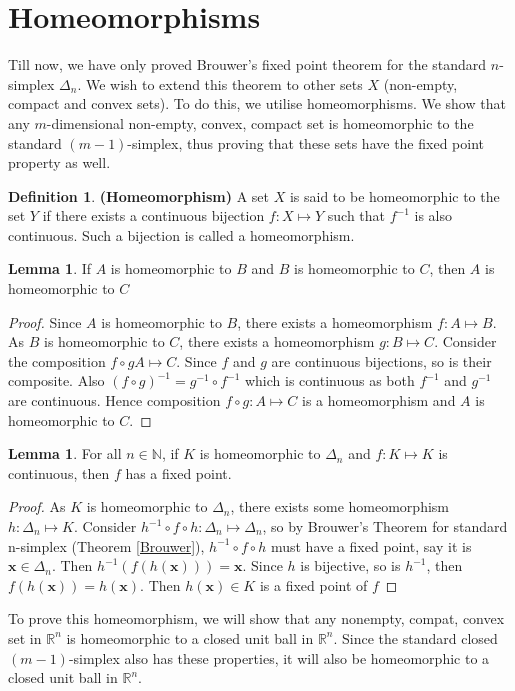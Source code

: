 \documentclass{article}
\theoremstyle{definition}
\newtheorem{lem}[theorem]{Lemma}
\newtheorem{defn}[theorem]{Definition}
\begin{document}
\section{Homeomorphisms}
Till now, we have only proved Brouwer’s fixed point theorem for the standard $n$-simplex $\Delta_n$. We wish to extend this theorem to other sets $X$ (non-empty, compact and convex sets). To do this, we utilise homeomorphisms. We show that any $m$-dimensional non-empty, convex, compact set is homeomorphic to the standard $(m-1)$-simplex, thus proving that these sets have the fixed point property as well.
\begin{defn}
\textbf{(Homeomorphism)} A set $X$ is said to be homeomorphic to the set $Y$ if there exists a continuous bijection $f:X\mapsto Y$ such that $f^{-1}$ is also continuous. Such a bijection is called a homeomorphism.
\end{defn}
\begin{lem}
\label{Homeo Transitivity}
If $A$ is homeomorphic to $B$ and $B$ is homeomorphic to $C$, then $A$ is homeomorphic to $C$
\end{lem}
\begin{proof}
Since $A$ is homeomorphic to $B$, there exists a homeomorphism $f:A\mapsto B$. As $B$ is homeomorphic to $C$, there exists a homeomorphism $g:B\mapsto C$. Consider the composition $f\circ g A\mapsto C$. Since $f$ and $g$ are continuous bijections, so is their composite. Also $(f\circ g)^{-1} = g^{-1} \circ f^{-1}$ which is continuous as both $f^{-1}$ and $g^{-1}$ are continuous. Hence composition $f\circ g:A\mapsto C$ is a homeomorphism and $A$ is homeomorphic to $C$.
\end{proof}
\begin{lem}
\label{Fixed Point}
For all $n\in \mathbb{N}$, if $K$ is homeomorphic to $\Delta_n$ and $f:K\mapsto K$ is continuous, then $f$ has a fixed point.
\end{lem}
\begin{proof}
As $K$ is homeomorphic to $\Delta_n$, there exists some homeomorphism $h:\Delta_n \mapsto K$. Consider $h^{-1} \circ f\circ h :\Delta_n\mapsto \Delta_n$, so by Brouwer's Theorem for standard n-simplex (Theorem \ref{Brouwer}), $h^{-1} \circ f\circ h$ must have a fixed point, say it is $\mathbf{x}\in \Delta_n$. Then $h^{-1}(f(h(\mathbf{x}))) = \mathbf{x}$. Since $h$ is bijective, so is $h^{-1}$, then $f(h(\mathbf{x})) = h(\mathbf{x})$. Then $h(\mathbf{x})\in K$ is a fixed point of $f$
\end{proof}
To prove this homeomorphism, we will show that any nonempty, compat, convex set in $\mathbb{R}^n$ is homeomorphic to a closed unit ball in $\mathbb{R}^n$. Since the standard closed $(m-1)$-simplex also has these properties, it will also be homeomorphic to a closed unit ball in $\mathbb{R}^n$.\\
\end{document}
